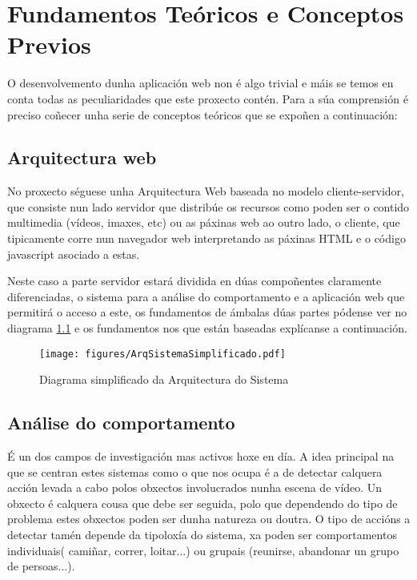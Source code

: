 \chapter{Fundamentos Teóricos e Conceptos Previos}

O desenvolvemento dunha aplicación web non é algo trivial e máis se temos en conta todas
as peculiaridades que este proxecto contén. Para a súa comprensión é preciso coñecer unha
serie de conceptos teóricos que se expoñen a continuación:

\section{Arquitectura web}
	No proxecto séguese unha Arquitectura Web baseada no modelo cliente-servidor, que 
	consiste nun lado servidor que distribúe os recursos como poden ser o contido multimedia
	(vídeos, imaxes, etc) ou as páxinas web ao outro lado, o cliente, que tipicamente corre 
	nun navegador web interpretando as páxinas HTML e o código javascript asociado a estas.
	
	Neste caso a parte servidor estará dividida en dúas compoñentes claramente diferenciadas,
	o sistema para a análise do comportamento e a aplicación web que permitirá o acceso a este, 
	os fundamentos de ámbalas dúas partes pódense ver no diagrama 
	\ref{fig:ArqSistemaSimplificado} e os fundamentos nos que están baseadas explícanse a 
	continuación.
	
    \begin{figure}[htp]
    \begin{center}
        \texttt{[image: figures/ArqSistemaSimplificado.pdf]}
        \caption{Diagrama simplificado da Arquitectura do Sistema}
    \label{fig:ArqSistemaSimplificado}
    \end{center}
    \end{figure}
	
\section{Análise do comportamento}
	É un dos campos de investigación mas activos hoxe en día. A idea principal na que se 
	centran estes sistemas como o que nos ocupa é a de detectar calquera acción levada a 
	cabo polos obxectos involucrados nunha escena de vídeo. Un obxecto é calquera cousa 
	que debe ser seguida, polo que dependendo do tipo de problema estes obxectos poden 
	ser dunha natureza ou doutra.
	O tipo de accións a detectar tamén depende da tipoloxía do sistema, xa poden ser
	comportamentos individuais( camiñar, correr, loitar...) ou grupais (reunirse, abandonar
	un grupo de persoas...).
	
